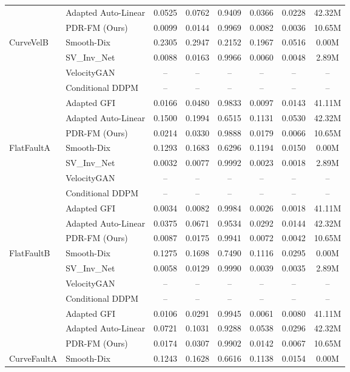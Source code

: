 \documentclass[letterpaper]{article}
\begin{document}
\begin{table}[t]
{\begin{tabular}{llcccccc}
 & Adapted Auto-Linear & 0.0525 & 0.0762 & 0.9409 & 0.0366 & 0.0228 & 42.32M \\
 & PDR-FM (Ours) & 0.0099 & 0.0144 & 0.9969 & 0.0082 & 0.0036 & 10.65M \\
\hline
CurveVelB & Smooth-Dix & 0.2305 & 0.2947 & 0.2152 & 0.1967 & 0.0516 & 0.00M \\
 & SV\_Inv\_Net & 0.0088 & 0.0163 & 0.9966 & 0.0060 & 0.0048 & 2.89M \\
 & VelocityGAN & -- & -- & -- & -- & -- & -- \\
 & Conditional DDPM & -- & -- & -- & -- & -- & -- \\
 & Adapted GFI & 0.0166 & 0.0480 & 0.9833 & 0.0097 & 0.0143 & 41.11M \\
 & Adapted Auto-Linear & 0.1500 & 0.1994 & 0.6515 & 0.1131 & 0.0530 & 42.32M \\
 & PDR-FM (Ours) & 0.0214 & 0.0330 & 0.9888 & 0.0179 & 0.0066 & 10.65M \\
\hline
FlatFaultA & Smooth-Dix & 0.1293 & 0.1683 & 0.6296 & 0.1194 & 0.0150 & 0.00M \\
 & SV\_Inv\_Net & 0.0032 & 0.0077 & 0.9992 & 0.0023 & 0.0018 & 2.89M \\
 & VelocityGAN & -- & -- & -- & -- & -- & -- \\
 & Conditional DDPM & -- & -- & -- & -- & -- & -- \\
 & Adapted GFI & 0.0034 & 0.0082 & 0.9984 & 0.0026 & 0.0018 & 41.11M \\
 & Adapted Auto-Linear & 0.0375 & 0.0671 & 0.9534 & 0.0292 & 0.0144 & 42.32M \\
 & PDR-FM (Ours) & 0.0087 & 0.0175 & 0.9941 & 0.0072 & 0.0042 & 10.65M \\
\hline
FlatFaultB & Smooth-Dix & 0.1275 & 0.1698 & 0.7490 & 0.1116 & 0.0295 & 0.00M \\
 & SV\_Inv\_Net & 0.0058 & 0.0129 & 0.9990 & 0.0039 & 0.0035 & 2.89M \\
 & VelocityGAN & -- & -- & -- & -- & -- & -- \\
 & Conditional DDPM & -- & -- & -- & -- & -- & -- \\
 & Adapted GFI & 0.0106 & 0.0291 & 0.9945 & 0.0061 & 0.0080 & 41.11M \\
 & Adapted Auto-Linear & 0.0721 & 0.1031 & 0.9288 & 0.0538 & 0.0296 & 42.32M \\
 & PDR-FM (Ours) & 0.0174 & 0.0307 & 0.9902 & 0.0142 & 0.0067 & 10.65M \\
\hline
CurveFaultA & Smooth-Dix & 0.1243 & 0.1628 & 0.6616 & 0.1138 & 0.0154 & 0.00M \\

\end{tabular}}
\end{table}
\end{document}
